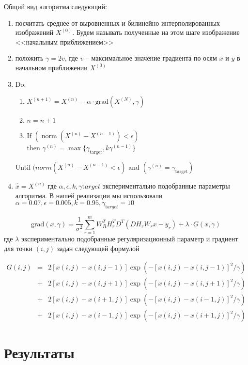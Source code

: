 Общий вид алгоритма следующий:
\begin{enumerate}
  \item посчитать среднее от выровненных и билинейно интерполированных изображений $X^{(0)}$. Будем называть полученные на этом
    шаге изображение <<начальным приближением>>
  \item положить $\gamma = 2v$, где $v$ -- максимальное значение градиента по осям $x$ и $y$ в начальном приближении
    $X^{(0)}$
  \item Do:
    \begin{enumerate}
      \item $X^{(n+1)} = X^{(n)} - \alpha\cdot\mathrm{grad}(X^{(N)}, \gamma) $
      \item $n=n+1$
      \item If $(\operatorname{norm}(X^{(n)}-X^{(n-1)}) < \epsilon)$\\
        then $\gamma^{(n)} = \max \{\gamma_{\mathrm{target}}, k\gamma^{(n-1)}\}$
    \end{enumerate}
    Until $(norm(X^{(n)}-X^{(n-1)} < \epsilon)$ and $(\gamma^{(n)} = \gamma_{\mathrm{target}})$

  \item $ \hat{x} = X^{(n)}$
    где $\alpha, \epsilon, k, \gamma{\mathrm target} $ экспериментально подобранные параметры алгоритма. В нашей
    реализации мы использовали $\alpha = 0.07, \epsilon=0.005, k=0.95, \gamma_{\mathrm target}=10$
\end{enumerate}
$$
\mathrm{grad}(x, \gamma) = \frac{1}{\sigma^2} \sum^m_{r=1} W^T_R H^T_r D^T (D H_r W_r x-y_r) + \lambda \cdot G(x, \gamma)
$$
где $\lambda$ экспериментально подобранные регуляризационный параметр и градиент для точки $(i,j)$ задан следующей формулой

$$
\begin{array}{rcl}
 G(i,j) & = & 2\left[x(i,j)-x(i,j-1)\right] \exp\left(-[ x(i,j)-x(i,j-1) ]^2/\gamma \right) \\
& + & 2\left[x(i,j)-x(i,j+1)\right] \exp\left(-[ x(i,j)-x(i,j+1) ]^2/\gamma \right) \\
& + & 2\left[x(i,j)-x(i+1,j)\right] \exp\left(-[ x(i,j)-x(i-1,j) ]^2/\gamma \right) \\
& + & 2\left[x(i,j)-x(i-1,j)\right] \exp\left(-[ x(i,j)-x(i+1,j) ]^2/\gamma \right)
\end{array}
$$


\section{Результаты}


